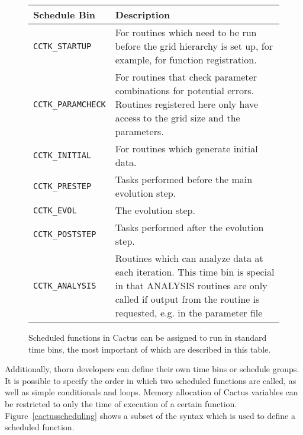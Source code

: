 \documentclass[conference]{IEEEtran}
\begin{document}
\begin{figure}
{\small
\begin{tabular}{|l|p{49 mm}|}
\hline
{\bf Schedule Bin} & {\bf Description} \\
\hline \hline
\texttt{CCTK\_STARTUP} &
For routines which need to be run before the grid hierarchy is set up, for example, for function
registration.\\
\hline
\texttt{CCTK\_PARAMCHECK} &
For routines that check parameter combinations for potential errors. Routines registered here
only have access to the grid size and the parameters.\\
\hline
\texttt{CCTK\_INITIAL} &
For routines which generate initial data.\\
\hline
\texttt{CCTK\_PRESTEP} &
Tasks performed before the main evolution step.\\
\hline
\texttt{CCTK\_EVOL} &
The evolution step.\\
\hline
\texttt{CCTK\_POSTSTEP} &
Tasks performed after the evolution step.\\
\hline
\texttt{CCTK\_ANALYSIS} &
Routines which can analyze data at each iteration. This time bin is special in that ANALYSIS routines are only called if output from the routine is requested, e.g. in the parameter file\\
\hline
\end{tabular}
}
\caption{Scheduled functions in Cactus can be assigned to run in standard time bins, the most important of which are described in this table.}
\label{CactusTime Bins}
\end{figure}


Additionally, 
thorn developers can define their own time bins or schedule groups.
It is possible to specify the order in
which two scheduled functions are called,
as well as simple conditionals and loops.
Memory allocation of Cactus variables can be restricted to only the time of execution of a
certain function.
Figure~\ref{cactusscheduling} shows a subset of the syntax which is used to define a scheduled function.
\end{document}
